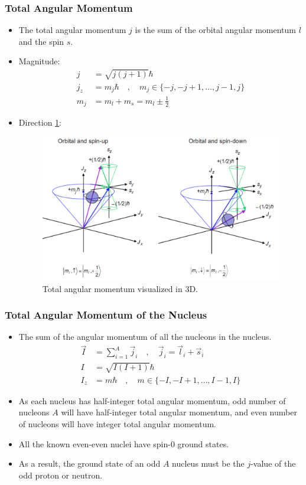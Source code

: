 \subsubsection{Total Angular Momentum}
\begin{itemize}
    \item The total angular momentum $j$ is the sum of the orbital angular momentum $l$ and the spin $s$.
    \item Magnitude: 
    \begin{align}
    j &= \sqrt{j(j+1)}ℏ \\
    j_z &= m_jℏ \quad , \quad m_j ∈ \{-j, -j+1, \ldots, j-1, j\} \\
    m_j &= m_l + m_s = m_l ± \frac{1}{2}
    \end{align}
    \item Direction \cref{fig: total_angular_momentum_visualized}:
    \begin{figure}[h!]
    \centering
    \includegraphics[width = .75\textwidth]{total_angular_momentum_visualized.png}
    \caption{Total angular momentum visualized in 3D.}
    \label{fig: total_angular_momentum_visualized}
    \end{figure}
\end{itemize}

\subsubsection{Total Angular Momentum of the Nucleus}
\begin{itemize}
    \item The sum of the angular momentum of all the nucleons in the nucleus. 
    \begin{align}
    \vec{I} &= \sum_{i=1}^{A} \vec{j}_i \quad , \quad  \vec{j}_i = \vec{l}_i + \vec{s}_i \\
    I &= \sqrt{I(I+1)}ℏ \\
    I_z &= mℏ \quad , \quad m ∈ \{-I, -I+1, \ldots, I-1, I\}
    \end{align} 
    \item As each nucleus has half-integer total angular momentum, odd number of nucleons $A$ will have half-integer total angular momentum, and even number of nucleons will have integer total angular momentum.
    \item All the known even-even nuclei have spin-0 ground states. 
    \item As a result, the ground state of an odd $A$ nucleus must be the $j$-value of the odd proton or neutron. 
\end{itemize}

